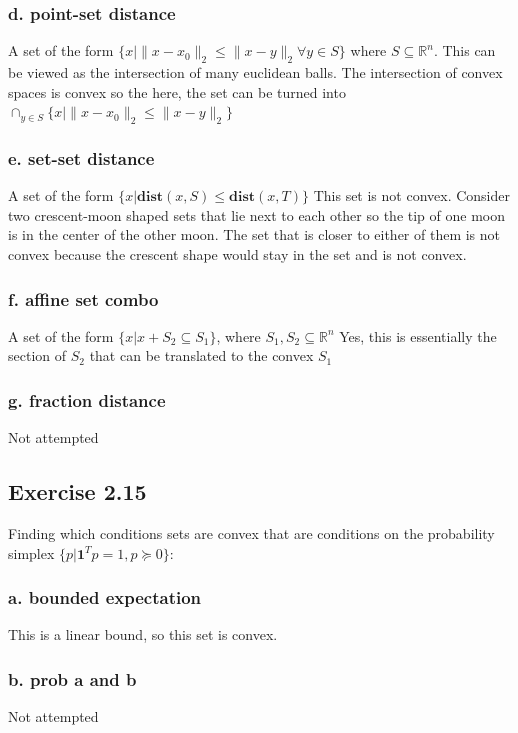 \subsubsection{d. point-set distance}
A set of the form $\{ x |  \| x-x_0 \|_2 \leq \| x-y \|_2 \forall y \in S\}$ where $S \subseteq \mathbb{R}^n$. 
This can be viewed as the intersection of many euclidean balls. The intersection of convex spaces is convex so the here, the set can be turned into $\cap_{y \in S} \{ x |  \| x-x_0 \|_2 \leq \| x-y \|_2\}$
\subsubsection{e. set-set distance}
A set of the form $\{ x | \textbf{dist}(x,S) \leq  \textbf{dist}(x,T) \}$
This set is not convex. Consider two crescent-moon shaped sets that lie next to each other so the tip of one moon is in the center of the other moon. The set that is closer to either of them is not convex because the crescent shape would stay in the set and is not convex.

\subsubsection{f. affine set combo}
A set of the form $\{ x | x + S_2 \subseteq S_1 \}$, where $S_1, S_2 \subseteq \mathbb{R}^n$
Yes, this is essentially the section of $S_2$ that can be translated to the convex $S_1$

\subsubsection{g. fraction distance}
Not attempted


\subsection{Exercise 2.15}
Finding which conditions sets are convex that are conditions on the probability simplex $\{ p | \textbf{1}^T p = 1, p  \succeq 0 \}$:
\subsubsection{a. bounded expectation}
This is a linear bound, so this set is convex.

\subsubsection{b. prob a and b}
Not attempted

